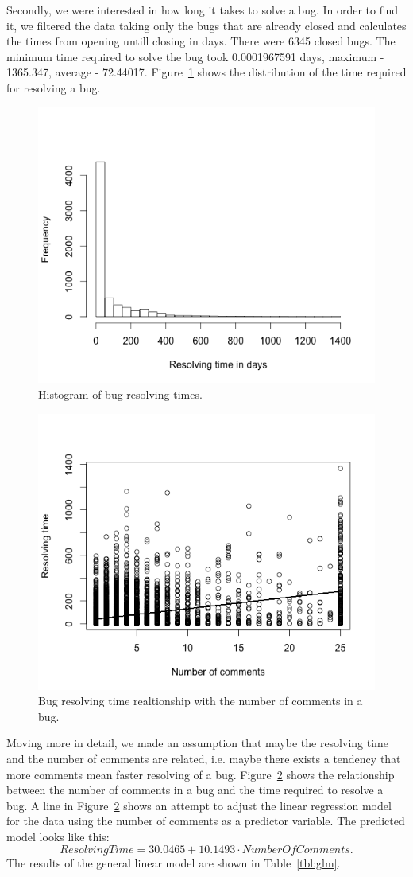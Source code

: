 \documentclass[a4paper,11pt]{report}
\begin{document}
Secondly, we were interested in how long it takes to solve a bug. In order to find it, we filtered the data taking only the bugs that are already closed and calculates the times from opening untill closing in days. There were 6345 closed bugs. The minimum time required to solve the bug took 0.0001967591 days, maximum - 1365.347, average - 72.44017. Figure~\ref{fig:res_times} shows the distribution of the time required for resolving a bug.

\begin{figure}[ht!]
\centering
\includegraphics[width=.7\textwidth]{resolving_times.png}
\caption{Histogram of bug resolving times.}
\label{fig:res_times}
\end{figure}
 
\begin{figure}[ht!]
\centering
\includegraphics[width=.7\textwidth]{comments_time.png}
\caption{Bug resolving time realtionship with the number of comments in a bug.}
\label{fig:com_time}
\end{figure}

Moving more in detail, we made an assumption that maybe the resolving time and the number of comments are related, i.e. maybe there exists a tendency that more comments mean faster resolving of a bug. Figure~\ref{fig:com_time} shows the relationship between the number of comments in a bug and the time required to resolve a bug. A line in Figure~\ref{fig:com_time} shows an attempt to adjust the linear regression model for the data using the number of comments as a predictor variable. The predicted model looks like this:
\[
ResolvingTime=30.0465 + 10.1493 \cdot NumberOfComments.\]
The results of the general linear model are shown in Table~\ref{tbl:glm}.
\end{document}
